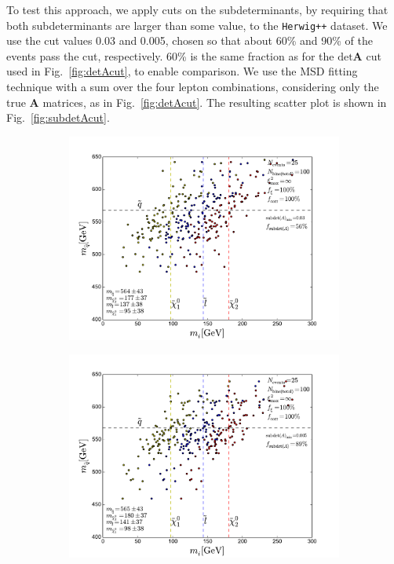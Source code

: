 \documentclass[twoside,english]{uiofysmaster}
\begin{document}
To test this approach, we apply cuts on the subdeterminants, by requiring that both subdeterminants are larger than some value, to the {\tt Herwig++} dataset. We use the cut values 0.03 and 0.005, chosen so that about 60\% and 90\% of the events pass the cut, respectively. 60\% is the same fraction as for the $\mathrm{det}\mathbf A$ cut used in Fig.\ \ref{fig:detAcut}, to enable comparison. We use the MSD fitting technique with a sum over the four lepton combinations, considering only the true $\mathbf A$ matrices, as in Fig.\ \ref{fig:detAcut}. The resulting scatter plot is shown in Fig.\ \ref{fig:subdetAcut}.
\begin{figure}[hbt]
	\centering
  \begin{subfigure}[b]{0.49\textwidth}
		\includegraphics[width=\textwidth]{figures/improving_combinatorics/4combosum_herwigpp-nosmear-noxisqcut-subdetAcut0p03.pdf}
    \caption{}
    \label{fig:subdetAcut_a}
  \end{subfigure}
  \begin{subfigure}[b]{0.49\textwidth}
    \includegraphics[width=\textwidth]{figures/improving_combinatorics/4combosum_herwigpp-nosmear-noxisqcut-subdetAcut0p005.pdf}

\end{subfigure}
\end{figure}
\end{document}

